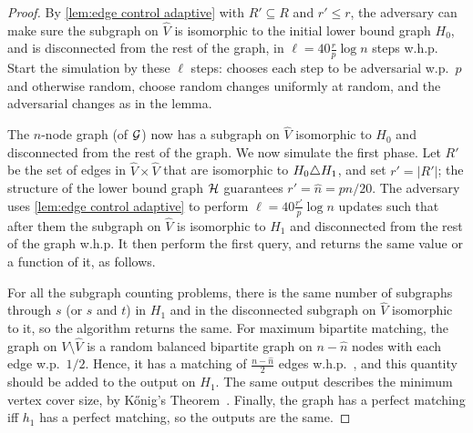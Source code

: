 \documentclass[letter,11pt]{article}
\begin{document}
\begin{proof}
    By \cref{lem:edge control adaptive} with $R'\subseteq R$ and $r'\leq r$,
    the adversary can make sure the subgraph on $\hat V$ is isomorphic to the initial lower bound graph $H_0$,
    and is disconnected from the rest of the graph,
    in %
     $\ell=40 \frac{r}{p}\log n$
     steps w.h.p. 
	Start the simulation by these $\ell$ steps:
	chooses each step to be adversarial w.p.~$p$ and otherwise random,
	choose random changes uniformly at random, and the adversarial changes as in the lemma.
	
	The $n$-node graph (of $\cal G$) now has a subgraph on $\hat V$  isomorphic to $H_0$ and disconnected from the rest of the graph.
	We now simulate the first phase.
	Let $R'$ be the set of edges in $\hat V\times \hat V$ that are isomorphic to $H_0\triangle H_1$, and set $r'=|R'|$;
	the structure of the lower bound graph $\cal H$ guarantees 
	$r'=\hat n=pn/20$.
	The adversary uses \cref{lem:edge control adaptive} 
    to perform %
    $\ell=40 \frac{r'}{p}\log n$
    updates
    such that after them the subgraph on $\hat V$ is isomorphic to $H_1$ and disconnected from the rest of the graph w.h.p. 
    It then perform the first query, and returns the same value or a function of it, as follows.
	
	For all the subgraph counting problems, there is the same number of subgraphs through $s$ (or $s$ and $t$) in $H_1$ and in the disconnected subgraph on $\hat V$ isomorphic to it,
	so the algorithm returns the same.
	For maximum bipartite matching,
	the graph on $V\setminus\hat V$ is a random balanced bipartite graph on $n-\hat n$ nodes with each edge w.p.~$1/2$.
	Hence, it has a matching of $\frac{n-\hat n}{2}$ edges w.h.p.~\cite{ER64},
	and this quantity should be added to the output on $H_1$.
	The same output describes the minimum vertex cover size, by K\H{o}nig's Theorem~\cite{Konig31}.
	Finally, the graph has a perfect matching iff $h_1$ has a perfect matching, so the outputs are the same.


\end{proof}
\end{document}
